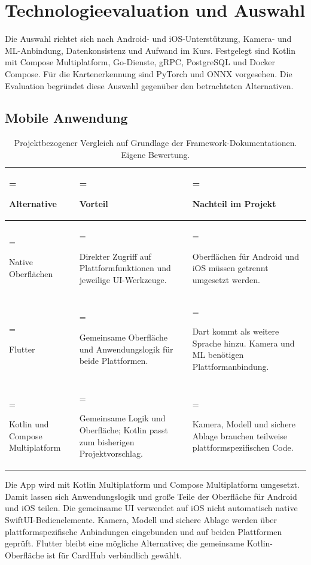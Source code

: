 \section{Technologieevaluation und Auswahl}

Die Auswahl richtet sich nach Android- und iOS-Unterstützung, Kamera- und ML-Anbindung, Datenkonsistenz und Aufwand im Kurs. Festgelegt sind Kotlin mit Compose Multiplatform, Go-Dienste, gRPC, PostgreSQL und Docker Compose. Für die Kartenerkennung sind PyTorch und ONNX vorgesehen. Die Evaluation begründet diese Auswahl gegenüber den betrachteten Alternativen.

\subsection{Mobile Anwendung}
\begin{table}[H]
\centering
\small
\begin{tabularx}{\linewidth}{@{}>{\hsize=0.75\hsize\linewidth=\hsize\raggedright\arraybackslash}X >{\hsize=1.17\hsize\linewidth=\hsize\raggedright\arraybackslash}X >{\hsize=1.08\hsize\linewidth=\hsize\raggedright\arraybackslash}X@{}}
\toprule
\textbf{Alternative} & \textbf{Vorteil} & \textbf{Nachteil im Projekt} \\
\midrule
Native Oberflächen & Direkter Zugriff auf Plattformfunktionen und jeweilige UI-Werkzeuge. & Oberflächen für Android und iOS müssen getrennt umgesetzt werden. \\
Flutter & Gemeinsame Oberfläche und Anwendungslogik für beide Plattformen. & Dart kommt als weitere Sprache hinzu. Kamera und ML benötigen Plattformanbindung. \\
Kotlin und Compose Multiplatform & Gemeinsame Logik und Oberfläche; Kotlin passt zum bisherigen Projektvorschlag. & Kamera, Modell und sichere Ablage brauchen teilweise plattformspezifischen Code. \\
\bottomrule
\end{tabularx}
\caption{Projektbezogener Vergleich auf Grundlage der Framework-Dokumentationen. Eigene Bewertung. \cite{kmp,flutter}}
\end{table}
Die App wird mit Kotlin Multiplatform und Compose Multiplatform umgesetzt. Damit lassen sich Anwendungslogik und große Teile der Oberfläche für Android und iOS teilen. Die gemeinsame UI verwendet auf iOS nicht automatisch native SwiftUI-Bedienelemente. Kamera, Modell und sichere Ablage werden über plattformspezifische Anbindungen eingebunden und auf beiden Plattformen geprüft. Flutter bleibt eine mögliche Alternative; die gemeinsame Kotlin-Oberfläche ist für CardHub verbindlich gewählt. \cite{kmp}

